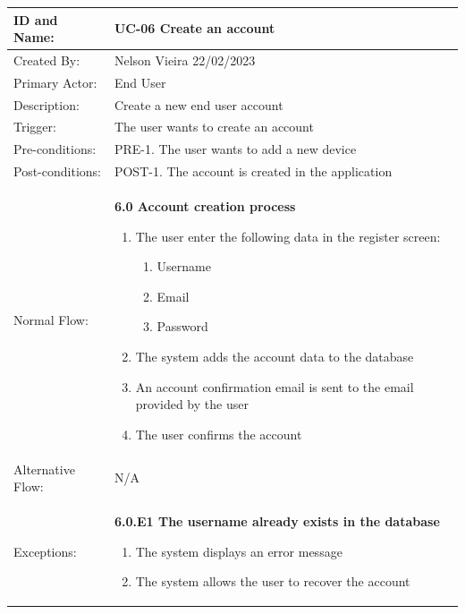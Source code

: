 \documentclass{scrreprt}
\begin{document}
\begin{table}[H]
    \centering
    \begin{adjustbox}{width=1.2\textwidth,center=\textwidth}
        \begin{tabular}{|m{4cm}|m{12cm}|}
            \hline
            ID and Name: & UC-06 Create an account \\
            \hline
            Created By: & Nelson Vieira 22/02/2023 \\
            \hline
            Primary Actor: & End User \\
            \hline
            Description: & Create a new end user account \\
            \hline
            Trigger: & The user wants to create an account \\
            \hline
            Pre-conditions: & PRE-1. The user wants to add a new device \\
            \hline
            Post-conditions: & POST-1. The account is created in the application \\
            \hline
            Normal Flow: & \textbf{6.0 Account creation process}
            \begin{enumerate}
                \item The user enter the following data in the register screen:
                \begin{enumerate}
                    \item Username
                    \item Email
                    \item Password
                \end{enumerate}
                \item The system adds the account data to the database
                \item An account confirmation email is sent to the email provided by the user
                \item The user confirms the account
            \end{enumerate} \\
            \hline
            Alternative Flow: & N/A \\
            \hline
            Exceptions: & \textbf{6.0.E1  The username already exists in the database}
            \begin{enumerate}
                \item The system displays an error message
                \item The system allows the user to recover the account

\end{enumerate}
\end{tabular}
\end{adjustbox}
\end{table}
\end{document}
